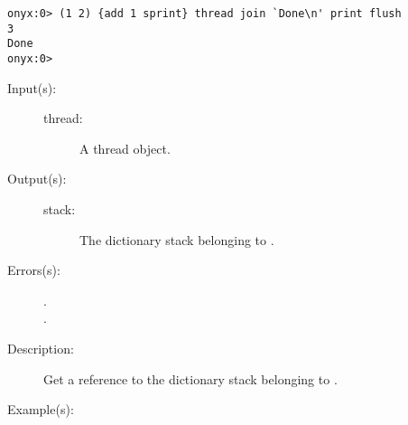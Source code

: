 \begin{description}
\begin{description}
\begin{verbatim}
onyx:0> (1 2) {add 1 sprint} thread join `Done\n' print flush
3
Done
onyx:0>
		\end{verbatim}
	\end{description}
\label{systemdict:threaddstack}
\item[{\onyxop{thread}{threaddstack}{stack}}: ]
	\begin{description}\item[]
	\item[Input(s): ]
		\begin{description}\item[]
		\item[thread: ]
			A thread object.
		\end{description}
	\item[Output(s): ]
		\begin{description}\item[]
		\item[stack: ]
			The dictionary stack belonging to .
		\end{description}
	\item[Errors(s): ]
		\begin{description}\item[]
		\item[.]
		\item[.]
		\end{description}
	\item[Description: ]
		Get a reference to the dictionary stack belonging to
		.
	\item[Example(s): ]\begin{verbatim}


\end{verbatim}
\end{description}
\end{description}

